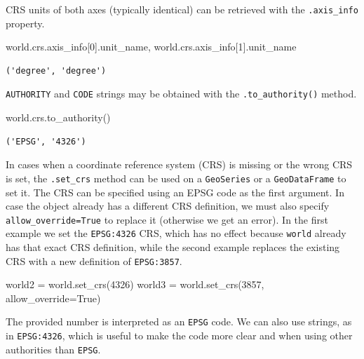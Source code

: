 \documentclass[
  letterpaper,
]{krantz}
\newenvironment{Shaded}{\begin{snugshade}}{\end{snugshade}}
\newcommand{\DecValTok}[1]{\textcolor[rgb]{0.68,0.00,0.00}{#1}}
\newcommand{\NormalTok}[1]{\textcolor[rgb]{0.00,0.23,0.31}{#1}}
\newcommand{\OperatorTok}[1]{\textcolor[rgb]{0.37,0.37,0.37}{#1}}
\newcommand{\VariableTok}[1]{\textcolor[rgb]{0.07,0.07,0.07}{#1}}
\begin{document}
CRS units of both axes (typically identical) can be retrieved with the
\texttt{.axis\_info} property.

\begin{Shaded}
\begin{Highlighting}[]
\NormalTok{world.crs.axis\_info[}\DecValTok{0}\NormalTok{].unit\_name, world.crs.axis\_info[}\DecValTok{1}\NormalTok{].unit\_name}
\end{Highlighting}
\end{Shaded}

\begin{verbatim}
('degree', 'degree')
\end{verbatim}

\texttt{AUTHORITY} and \texttt{CODE} strings may be obtained with the
\texttt{.to\_authority()} method.

\begin{Shaded}
\begin{Highlighting}[]
\NormalTok{world.crs.to\_authority()}
\end{Highlighting}
\end{Shaded}

\begin{verbatim}
('EPSG', '4326')
\end{verbatim}

In cases when a coordinate reference system (CRS) is missing or the
wrong CRS is set, the \texttt{.set\_crs} method can be used on a
\texttt{GeoSeries} or a \texttt{GeoDataFrame} to set it. The CRS can be
specified using an EPSG code as the first argument. In case the object
already has a different CRS definition, we must also specify
\texttt{allow\_override=True} to replace it (otherwise we get an error).
In the first example we set the \texttt{EPSG:4326} CRS, which has no
effect because \texttt{world} already has that exact CRS definition,
while the second example replaces the existing CRS with a new definition
of \texttt{EPSG:3857}.

\begin{Shaded}
\begin{Highlighting}[]
\NormalTok{world2 }\OperatorTok{=}\NormalTok{ world.set\_crs(}\DecValTok{4326}\NormalTok{)}
\NormalTok{world3 }\OperatorTok{=}\NormalTok{ world.set\_crs(}\DecValTok{3857}\NormalTok{, allow\_override}\OperatorTok{=}\VariableTok{True}\NormalTok{)}
\end{Highlighting}
\end{Shaded}

The provided number is interpreted as an \texttt{EPSG} code. We can also
use strings, as in
\texttt{\textquotesingle{}EPSG:4326\textquotesingle{}}, which is useful
to make the code more clear and when using other authorities than
\texttt{EPSG}.
\end{document}
